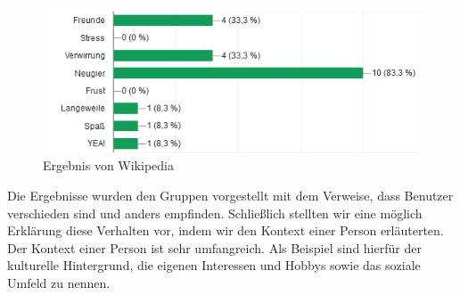 \begin{figure}[!h]
	\centering
	\includegraphics[width=0.9\linewidth]{Pictures/bizbuzz}
	\caption[Ergebnis von Wikipedia]{Ergebnis von Wikipedia}
	\label{fig:ergebnis_2}
\end{figure}


Die Ergebnisse wurden den Gruppen vorgestellt mit dem Verweise, dass Benutzer verschieden sind und anders empfinden. Schließlich stellten wir eine möglich Erklärung diese Verhalten vor, indem wir den Kontext einer Person erläuterten. Der Kontext einer Person ist sehr umfangreich. Als Beispiel sind hierfür der kulturelle Hintergrund, die eigenen Interessen und Hobbys sowie das soziale Umfeld zu nennen.  




